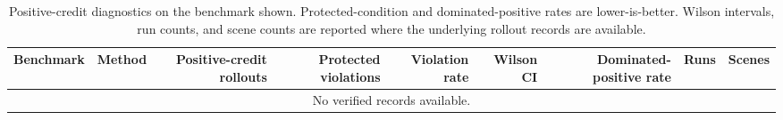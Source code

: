 \begin{table}[t]
\centering
\small
\caption{Positive-credit diagnostics on the benchmark shown. Protected-condition and dominated-positive rates are lower-is-better. Wilson intervals, run counts, and scene counts are reported where the underlying rollout records are available.}
\label{tab:supp_positive_credit}
\begin{tabular}{lrrrrrrrr}
\toprule
Benchmark & Method & Positive-credit rollouts & Protected violations & Violation rate & Wilson CI & Dominated-positive rate & Runs & Scenes \\
\midrule
\multicolumn{9}{c}{No verified records available.} \\
\bottomrule
\end{tabular}
\end{table}
